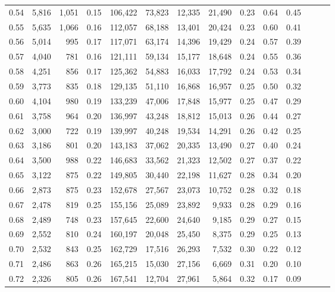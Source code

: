\begin{tabular}{rrrrrrrrrrrrrr}
0.54 &  5,816 &  1,051 &  0.15 &  106,422 &   73,823 &  12,335 &  21,490 &  0.23 &  0.64 &      0.45 \\
0.55 &  5,635 &  1,066 &  0.16 &  112,057 &   68,188 &  13,401 &  20,424 &  0.23 &  0.60 &      0.41 \\
0.56 &  5,014 &    995 &  0.17 &  117,071 &   63,174 &  14,396 &  19,429 &  0.24 &  0.57 &      0.39 \\
0.57 &  4,040 &    781 &  0.16 &  121,111 &   59,134 &  15,177 &  18,648 &  0.24 &  0.55 &      0.36 \\
0.58 &  4,251 &    856 &  0.17 &  125,362 &   54,883 &  16,033 &  17,792 &  0.24 &  0.53 &      0.34 \\
0.59 &  3,773 &    835 &  0.18 &  129,135 &   51,110 &  16,868 &  16,957 &  0.25 &  0.50 &      0.32 \\
0.60 &  4,104 &    980 &  0.19 &  133,239 &   47,006 &  17,848 &  15,977 &  0.25 &  0.47 &      0.29 \\
0.61 &  3,758 &    964 &  0.20 &  136,997 &   43,248 &  18,812 &  15,013 &  0.26 &  0.44 &      0.27 \\
0.62 &  3,000 &    722 &  0.19 &  139,997 &   40,248 &  19,534 &  14,291 &  0.26 &  0.42 &      0.25 \\
0.63 &  3,186 &    801 &  0.20 &  143,183 &   37,062 &  20,335 &  13,490 &  0.27 &  0.40 &      0.24 \\
0.64 &  3,500 &    988 &  0.22 &  146,683 &   33,562 &  21,323 &  12,502 &  0.27 &  0.37 &      0.22 \\
0.65 &  3,122 &    875 &  0.22 &  149,805 &   30,440 &  22,198 &  11,627 &  0.28 &  0.34 &      0.20 \\
0.66 &  2,873 &    875 &  0.23 &  152,678 &   27,567 &  23,073 &  10,752 &  0.28 &  0.32 &      0.18 \\
0.67 &  2,478 &    819 &  0.25 &  155,156 &   25,089 &  23,892 &   9,933 &  0.28 &  0.29 &      0.16 \\
0.68 &  2,489 &    748 &  0.23 &  157,645 &   22,600 &  24,640 &   9,185 &  0.29 &  0.27 &      0.15 \\
0.69 &  2,552 &    810 &  0.24 &  160,197 &   20,048 &  25,450 &   8,375 &  0.29 &  0.25 &      0.13 \\
0.70 &  2,532 &    843 &  0.25 &  162,729 &   17,516 &  26,293 &   7,532 &  0.30 &  0.22 &      0.12 \\
0.71 &  2,486 &    863 &  0.26 &  165,215 &   15,030 &  27,156 &   6,669 &  0.31 &  0.20 &      0.10 \\
0.72 &  2,326 &    805 &  0.26 &  167,541 &   12,704 &  27,961 &   5,864 &  0.32 &  0.17 &      0.09 \\

\end{tabular}
